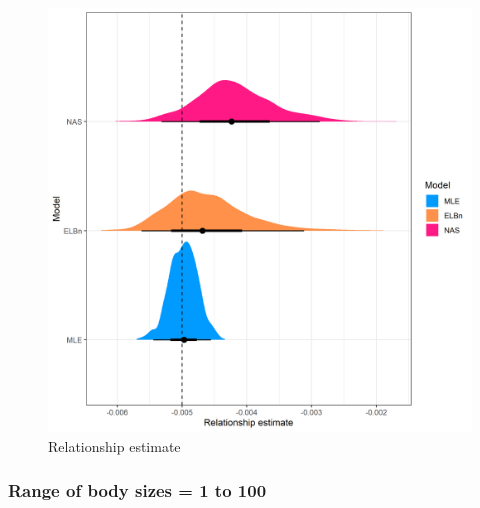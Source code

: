 \documentclass[
]{article}
\begin{document}
\begin{figure}
\centering
\includegraphics{figures/PLB_large_x_relationship_density.png}
\caption{Relationship estimate}
\end{figure}

\newpage

\hypertarget{range-of-body-sizes-1-to-100}{%
\subsubsection{Range of body sizes = 1 to
100}\label{range-of-body-sizes-1-to-100}}
\end{document}
